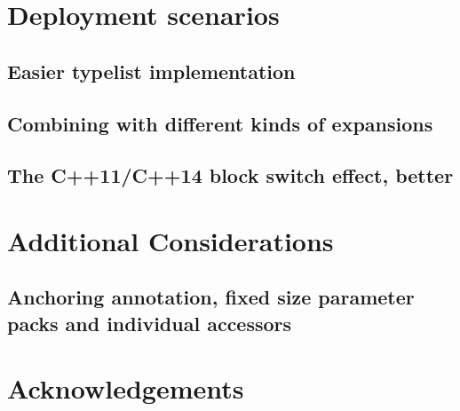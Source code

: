 \documentclass[ notitlepage
              , a4paper
              , twoside ]{article}
\begin{document}
\section{Deployment scenarios}
    \subsection{Easier typelist implementation}
        

    \subsection{Combining with different kinds of expansions}
        

    \subsection{The C++11/C++14 block switch effect, better}
        

\section{Additional Considerations}

\subsection{Anchoring annotation, fixed size parameter packs and individual accessors}
        

\section{Acknowledgements}
    

\printbibliography
\end{document}
